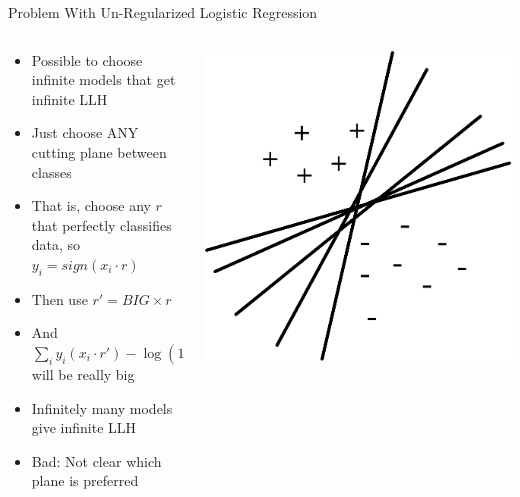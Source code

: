 \documentclass[aspectratio=169]{beamer}
\begin{document}
\begin{frame}{Problem With Un-Regularized Logistic Regression}

\begin{columns}
\begin{column}{0.6\textwidth}
	\begin{itemize}
	\item Possible to choose infinite models that get infinite LLH
	\item Just choose ANY cutting plane between classes
	\item That is, choose any $r$ that perfectly classifies data, so $y_i = sign (x_i \cdot r)$
	\item Then use $r' = BIG \times r$
	\item And $\sum_i y_i (x_i \cdot r') - \log (1 + e^{x_i \cdot r'})$ will be really big
	\item  Infinitely many models give infinite LLH
	\item Bad: Not clear which plane is preferred
	\end{itemize}
\end{column}
\begin{column}{0.4\textwidth}
\includegraphics[width=1\textwidth]{lectSVM/logRMany.pdf}
\end{column}
\end{columns}
\end{frame}
\end{document}
